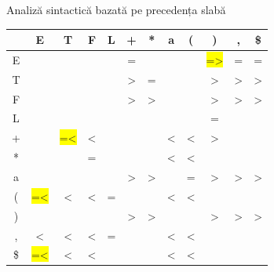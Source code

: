 \documentclass[pdf]{beamer}
\begin{document}
\begin{frame}{Analiză sintactică bazată pe precedența slabă}
\begin{center}
\setlength{\tabcolsep}{5pt}
\begin{table}
\begin{tabular}{| c | c | c | c | c | c | c | c | c | c | c | c | }
\hline
        &\color{blue}E&\color{blue}T&\color{blue}F&\color{blue}L&\color{blue}+&\color{blue}*&\color{blue}a&\color{blue}(&\color{blue})&\color{blue},&\color{blue}\$\\
        \hline
        \color{blue}E&&&&&\color{red}=&&&&\color{red}\colorbox{yellow}{=>}&\color{red}=&\color{red}=\\
        \hline
        \color{blue}T&&&&&\color{red}>&\color{red}=&&&\color{red}>&\color{red}>&\color{red}>\\
        \hline
        \color{blue}F&&&&&\color{red}>&\color{red}>&&&\color{red}>&\color{red}>&\color{red}>\\
        \hline
        \color{blue}L&&&&&&&&&\color{red}=&&\\
        \hline
        \color{blue}+&&\color{red}\colorbox{yellow}{=<}&\color{red}<&&&&\color{red}<&\color{red}<&\color{red}>&&\\
        \hline
        \color{blue}*&&&\color{red}=&&&&\color{red}<&\color{red}<&&&\\
        \hline
        \color{blue}a&&&&&\color{red}>&\color{red}>&&\color{red}=&\color{red}>&\color{red}>&\color{red}>\\
        \hline
        \color{blue}(&\color{red}\colorbox{yellow}{=<}&\color{red}<&\color{red}<&\color{red}=&&&\color{red}<&\color{red}<&&&\\
        \hline
        \color{blue})&&&&&\color{red}>&\color{red}>&&&\color{red}>&\color{red}>&\color{red}>\\
        \hline
        \color{blue},&\color{red}<&\color{red}<&\color{red}<&\color{red}=&&&\color{red}<&\color{red}<&&&\\
        \hline
        \color{blue}\$&\color{red}\colorbox{yellow}{=<}&\color{red}<&\color{red}<&&&&\color{red}<&\color{red}<&&&\\
        \hline

\end{tabular}
\end{table}
\end{center}
\end{frame}
\end{document}
